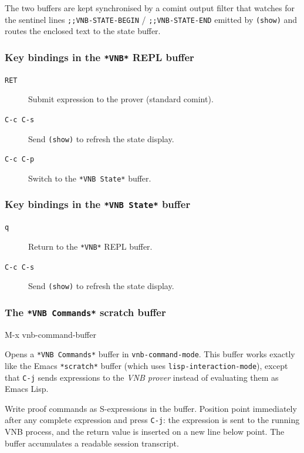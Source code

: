 \documentclass{amsbook}[openany]
\theoremstyle{definition}
\theoremstyle{remark}
\theoremstyle{remark}
\begin{document}
The two buffers are kept synchronised by a comint output filter that
watches for the sentinel lines \texttt{;;VNB-STATE-BEGIN} /
\texttt{;;VNB-STATE-END} emitted by \texttt{(show)} and routes the
enclosed text to the state buffer.

\subsubsection{Key bindings in the \texttt{*VNB*} REPL buffer}

\begin{description}
\item[\texttt{RET}] Submit expression to the prover (standard comint).
\item[\texttt{C-c C-s}] Send \texttt{(show)} to refresh the state display.
\item[\texttt{C-c C-p}] Switch to the \texttt{*VNB State*} buffer.
\end{description}

\subsubsection{Key bindings in the \texttt{*VNB State*} buffer}

\begin{description}
\item[\texttt{q}] Return to the \texttt{*VNB*} REPL buffer.
\item[\texttt{C-c C-s}] Send \texttt{(show)} to refresh the state display.
\end{description}

\subsubsection{The \texttt{*VNB Commands*} scratch buffer}

\begin{VNBsnip}
M-x vnb-command-buffer
\end{VNBsnip}

Opens a \texttt{*VNB Commands*} buffer in \texttt{vnb-command-mode}.
This buffer works exactly like the Emacs \texttt{*scratch*} buffer (which
uses \texttt{lisp-interaction-mode}), except that \texttt{C-j} sends
expressions to the \emph{VNB prover} instead of evaluating them as Emacs
Lisp.

Write proof commands as S-expressions in the buffer.  Position point
immediately after any complete expression and press \texttt{C-j}:
the expression is sent to the running VNB process, and the return value
is inserted on a new line below point.  The buffer accumulates a
readable session transcript.
\end{document}

